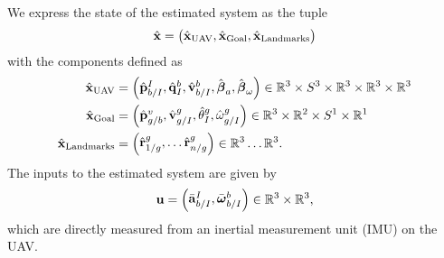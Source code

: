 
We express the state of the estimated system as the tuple
\begin{equation*}
  \hat{\boldsymbol{\mathrm{x}}} =
  \begin{pmatrix}
    \hat{\boldsymbol{\mathrm{x}}}_{\text{UAV}}, \hat{\boldsymbol{\mathrm{x}}}_{\text{Goal}}, \hat{\boldsymbol{\mathrm{x}}}_{\text{Landmarks}}
  \end{pmatrix}
\end{equation*}
with the components defined as
\begin{align*}
  \hat{\boldsymbol{\mathrm{x}}}_{\text{UAV}} &=
  \begin{pmatrix}
    \hat{\boldsymbol{\mathrm{p}}}_{b/I}^{I}, \hat{\boldsymbol{\mathrm{q}}}_I^{b}, \hat{\boldsymbol{\mathrm{v}}}_{b/I}^b,
    \hat{\boldsymbol{\mathrm{\beta}}}_a,
    \hat{\boldsymbol{\mathrm{\beta}}}_{\omega}
  \end{pmatrix}
  \in \mathbb{R}^3 \times S^3 \times \mathbb{R}^3 \times \mathbb{R}^3 \times
    \mathbb{R}^3  \\
    \hat{\boldsymbol{\mathrm{x}}}_{\text{Goal}} & =
    \begin{pmatrix}
      \hat{\boldsymbol{\mathrm{p}}}_{g/b}^{v}, \hat{\boldsymbol{\mathrm{v}}}_{g/I}^{g}, \hat{\theta}_{I}^{g},
      \hat{\omega}_{g/I}^{g}
    \end{pmatrix}
    \in \mathbb{R}^3 \times \mathbb{R}^2 \times S^1 \times \mathbb{R}^1
    \\
    \hat{\boldsymbol{\mathrm{x}}}_{\text{Landmarks}} & =
    \begin{pmatrix}
      \hat{\boldsymbol{\mathrm{r}}}_{1/g}^{g}, \dots \hat{\boldsymbol{\mathrm{r}}}_{n/g}^{g}
    \end{pmatrix}
    \in \mathbb{R}^3 \dots \mathbb{R}^3.
\end{align*}
The inputs to the estimated system are given by
\begin{equation*}
  \boldsymbol{\mathrm{u}} = \begin{pmatrix} \bar{\boldsymbol{\mathrm{a}}}_{b/I}^I, \bar{\boldsymbol{\mathrm{\omega}}}_{b/I}^b \end{pmatrix} \in
        \mathbb{R}^3 \times \mathbb{R}^3,
\end{equation*}
which are directly measured from an inertial measurement unit (IMU) on the UAV.

